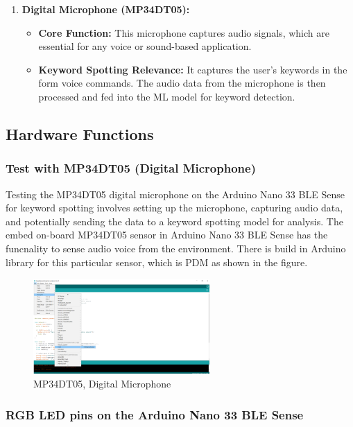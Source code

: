\begin{enumerate}
\begin{itemize}
	\end{itemize}
	\item\textbf{ Digital Microphone (MP34DT05):}
	\begin{itemize}
		\item \textbf{Core Function:} This microphone captures audio signals, which are essential for any voice or sound-based application.
		\item\textbf{ Keyword Spotting Relevance:} It captures the user's keywords in the form voice commands. The audio data from the microphone is then processed and fed into the ML model for keyword detection.
	\end{itemize}
	
\end{enumerate}

\subsection{Hardware Functions}

\subsubsection{Test with MP34DT05 (Digital Microphone)}

Testing the MP34DT05 digital microphone on the Arduino Nano 33 BLE Sense for keyword spotting involves setting up the microphone, capturing audio data, and potentially sending the data to a keyword spotting model for analysis. The embed on-board MP34DT05 sensor in Arduino Nano 33 BLE Sense has the
funcnality to sense audio voice from the environment. There is build in Arduino
library for this particular sensor, which is PDM as shown in the figure.

\begin{figure}[h!]
	\centering
	\includegraphics[width=0.6\textwidth]{Images/hardware/Digital-Microphone}
	\caption{MP34DT05, Digital Microphone} \label{fig:Digital-Microphone}
\end{figure}

\subsubsection{RGB LED pins on the Arduino Nano 33 BLE Sense}

